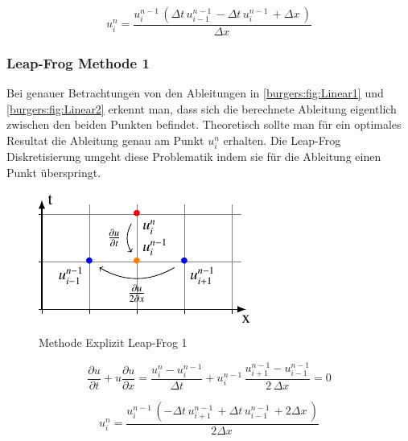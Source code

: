 	\begin{equation}
		u_{i}^{n} = \frac{u^{n-1}_{i}\, \left(\Delta{t}\, u^{n-1}_{i-1}\, - \Delta{t}\, u^{n-1}_{i}\, + \Delta{x}\,\right)}{\Delta{x}\,}
    	\label{burgers:eq_ex_sol_lin2}
	\end{equation}
	
\subsubsection{Leap-Frog Methode 1}
	
	Bei genauer Betrachtungen von den Ableitungen in \ref{burgers:fig:Linear1} und \ref{burgers:fig:Linear2} erkennt man, dass sich die berechnete Ableitung eigentlich zwischen den beiden Punkten befindet.
	Theoretisch sollte man für ein optimales Resultat die Ableitung genau am Punkt $u_{i}^{n}$ erhalten.
	\medskip
	Die Leap-Frog Diskretisierung umgeht diese Problematik indem sie f\"ur die Ableitung einen Punkt \"uberspringt.
	
	
	\begin{figure}[!ht]
	\centering
	\includegraphics[height=.4\textwidth]{papers/burgers/BurgersEquation/tikz/Linear3/Linear3.pdf}
	\caption{Methode Explizit Leap-Frog 1}
	\label{burgers:fig:Linear3}
	\end{figure}
	
	\begin{equation}
		\frac {\partial u}{\partial t}+u{\frac {\partial u}{\partial x}} = \frac{u_{i}^{n}-u_{i}^{n-1}}{\Delta t}+ u_{i}^{n-1}\, \frac{u_{i+1}^{n-1}-u_{i-1}^{n-1}}{2\,\Delta x}=0
		\label{burgers:eq_ex_lf1}
	\end{equation}

	\begin{equation}
	 u_{i}^{n} = \frac{u^{n-1}_{i}\, \left(- \Delta{t}\, u^{n-1}_{i+1}\, + \Delta{t}\, u^{n-1}_{i-1}\, + 2 \Delta{x}\,\right)}{2 \Delta{x}\,}
		\label{burgers:eq_ex_sol_lf1}
	\end{equation}

